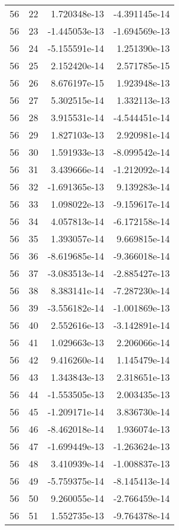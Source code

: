 \begin{tabular}{rrrr}
  56 &   22 &  1.720348e-13 & -4.391145e-14 \\
  56 &   23 & -1.445053e-13 & -1.694569e-13 \\
  56 &   24 & -5.155591e-14 &  1.251390e-13 \\
  56 &   25 &  2.152420e-14 &  2.571785e-15 \\
  56 &   26 &  8.676197e-15 &  1.923948e-13 \\
  56 &   27 &  5.302515e-14 &  1.332113e-13 \\
  56 &   28 &  3.915531e-14 & -4.544451e-14 \\
  56 &   29 &  1.827103e-13 &  2.920981e-14 \\
  56 &   30 &  1.591933e-13 & -8.099542e-14 \\
  56 &   31 &  3.439666e-14 & -1.212092e-14 \\
  56 &   32 & -1.691365e-13 &  9.139283e-14 \\
  56 &   33 &  1.098022e-13 & -9.159617e-14 \\
  56 &   34 &  4.057813e-14 & -6.172158e-14 \\
  56 &   35 &  1.393057e-14 &  9.669815e-14 \\
  56 &   36 & -8.619685e-14 & -9.366018e-14 \\
  56 &   37 & -3.083513e-14 & -2.885427e-13 \\
  56 &   38 &  8.383141e-14 & -7.287230e-14 \\
  56 &   39 & -3.556182e-14 & -1.001869e-13 \\
  56 &   40 &  2.552616e-13 & -3.142891e-14 \\
  56 &   41 &  1.029663e-13 &  2.206066e-14 \\
  56 &   42 &  9.416260e-14 &  1.145479e-14 \\
  56 &   43 &  1.343843e-13 &  2.318651e-13 \\
  56 &   44 & -1.553505e-13 &  2.003435e-13 \\
  56 &   45 & -1.209171e-14 &  3.836730e-14 \\
  56 &   46 & -8.462018e-14 &  1.936074e-13 \\
  56 &   47 & -1.699449e-13 & -1.263624e-13 \\
  56 &   48 &  3.410939e-14 & -1.008837e-13 \\
  56 &   49 & -5.759375e-14 & -8.145413e-14 \\
  56 &   50 &  9.260055e-14 & -2.766459e-14 \\
  56 &   51 &  1.552735e-13 & -9.764378e-14 \\

\end{tabular}
